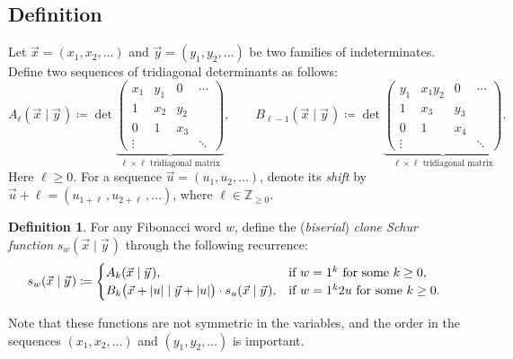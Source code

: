\documentclass[letterpaper,11pt,oneside,reqno]{article}
\numberwithin{equation}{section}
\newcommand{\ssp}{\hspace{1pt}}
\theoremstyle{definition}
\newtheorem{definition}[proposition]{Definition}
\begin{document}
\subsection{Definition}

Let $\vec x=(x_1,x_2,\ldots )$ and $\vec y=(y_1,y_2,\ldots)$ be two families of indeterminates.
Define two sequences of tridiagonal determinants as follows:
\begin{equation}
	\label{eq:A_B_dets}
	A_\ell (\vec{x} \mid \vec{y}\ssp) \coloneqq
	\det
	\underbrace{\begin{pmatrix}
	x_1 & y_1 & 0 & \cdots\\
	1 & x_2 & y_2 &\\
	0 & 1 & x_3  & \\
	\vdots & & & \ddots
	\end{pmatrix}}_{\text{$\ell \times \ell $ tridiagonal matrix}} ,
	\qquad
	B_{\ell -1} (\vec{x} \mid \vec{y}\ssp) \coloneqq
	\det
	\underbrace{\begin{pmatrix}
	y_1 & x_1y_2 & 0 & \cdots\\
	1 & x_3 & y_3 &\\
	0 & 1 & x_4 & \\
	\vdots & & & \ddots
	\end{pmatrix}}_{\text{$\ell \times \ell$ tridiagonal matrix}} .
\end{equation}
Here $\ell\ge0$.
For a sequence $\vec u=(u_1,u_2,\ldots)$,
denote its
\emph{shift} by $\vec u+ \ell = (u_{1+\ell} \, ,u_{2+\ell} \, ,\ldots)$, where $\ell\in \mathbb{Z}_{\ge0}$.


\begin{definition}
	\label{def:clone_Schur}
	For any Fibonacci word $w$,
	define the
	(\emph{biserial})
	\emph{clone Schur function} $s_w(\vec{x} \mid \vec{y}\ssp)$ through the following recurrence:
	\begin{equation}
		\label{eq:clone_Schur_recurrence_def}
		s_w (\vec{x} \mid \vec{y}\ssp)
		\coloneqq
		\begin{cases}
			A_k(\vec{x} \mid \vec{y}\ssp), & \textnormal{if $w=1^{k}$ for some $k\ge 0$},\\
			B_k\bigl( \vec{x}+|u| \mid \vec{y}+|u| \bigr)\cdot s_u (\vec{x} \mid \vec{y}\ssp)
			, & \textnormal{if $w=1^k2u$ for some $k\ge 0$}.
		\end{cases}
	\end{equation}
\end{definition}
Note that these functions are not symmetric in the variables,
and the order in the sequences $(x_1,x_2,\ldots)$ and $(y_1,y_2,\ldots)$ is important.
\end{document}
